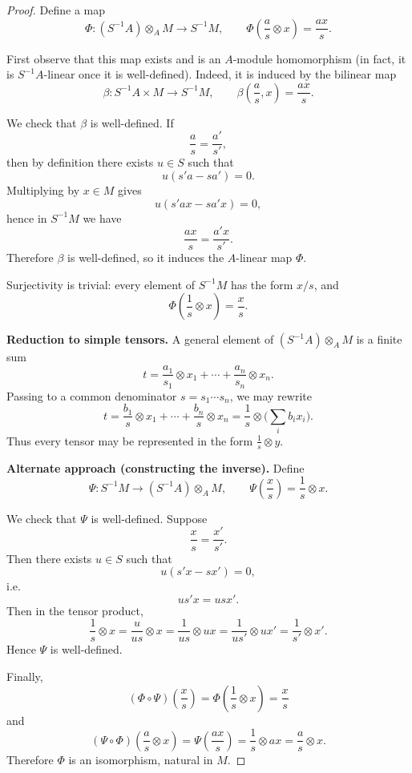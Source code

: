 \documentclass[11pt,a4paper]{article}
\theoremstyle{definition}
\theoremstyle{plain}
\theoremstyle{remark}
\begin{document}
\begin{proof}
    Define a map
    \[
    \Phi:(S^{-1}A)\otimes_A M \longrightarrow S^{-1}M,
    \qquad 
    \Phi\!\left(\frac{a}{s}\otimes x\right)=\frac{ax}{s}.
    \]

    First observe that this map exists and is an $A$-module homomorphism (in fact, it is $S^{-1}A$-linear once it is well-defined).
    Indeed, it is induced by the bilinear map
    \[
    \beta:S^{-1}A\times M\to S^{-1}M,
    \qquad 
    \beta\!\left(\frac{a}{s},x\right)=\frac{ax}{s}.
    \]

    We check that $\beta$ is well-defined. If
    \[
    \frac{a}{s}=\frac{a'}{s'},
    \]
    then by definition there exists $u\in S$ such that
    \[
    u(s'a-sa')=0.
    \]
    Multiplying by $x\in M$ gives
    \[
    u(s'ax-sa'x)=0,
    \]
    hence in $S^{-1}M$ we have
    \[
    \frac{ax}{s}=\frac{a'x}{s'}.
    \]
    Therefore $\beta$ is well-defined, so it induces the $A$-linear map $\Phi$.

    Surjectivity is trivial: every element of $S^{-1}M$ has the form $x/s$, and
    \[
    \Phi\!\left(\frac{1}{s}\otimes x\right)=\frac{x}{s}.
    \]

    \medskip

    \textbf{Reduction to simple tensors.}
    A general element of $(S^{-1}A)\otimes_A M$ is a finite sum
    \[
    t=\frac{a_1}{s_1}\otimes x_1+\cdots+\frac{a_n}{s_n}\otimes x_n.
    \]
    Passing to a common denominator $s=s_1\cdots s_n$, we may rewrite
    \[
    t=\frac{b_1}{s}\otimes x_1+\cdots+\frac{b_n}{s}\otimes x_n
    =\frac{1}{s}\otimes\Big(\sum_i b_i x_i\Big).
    \]
    Thus every tensor may be represented in the form $\frac{1}{s}\otimes y$.

    \medskip

    \textbf{Alternate approach (constructing the inverse).}
    Define
    \[
    \Psi:S^{-1}M\to (S^{-1}A)\otimes_A M,
    \qquad 
    \Psi\!\left(\frac{x}{s}\right)=\frac{1}{s}\otimes x.
    \]

    We check that $\Psi$ is well-defined. Suppose
    \[
    \frac{x}{s}=\frac{x'}{s'}.
    \]
    Then there exists $u\in S$ such that
    \[
    u(s'x-sx')=0,
    \]
    i.e.
    \[
    us'x=usx'.
    \]
    Then in the tensor product,
    \[
    \frac{1}{s}\otimes x
    =\frac{u}{us}\otimes x
    =\frac{1}{us}\otimes ux
    =\frac{1}{us'}\otimes ux'
    =\frac{1}{s'}\otimes x'.
    \]
    Hence $\Psi$ is well-defined.

    Finally,
    \[
        (\Phi\circ\Psi)\!\left(\frac{x}{s}\right)
        =\Phi\!\left(\frac{1}{s}\otimes x\right)
        =\frac{x}{s}
    \]
    and
    \[
    (\Psi\circ\Phi)\!\left(\frac{a}{s}\otimes x\right)
    =\Psi\!\left(\frac{ax}{s}\right)
    =\frac{1}{s}\otimes ax
    =\frac{a}{s}\otimes x.
    \]
    Therefore $\Phi$ is an isomorphism, natural in $M$.
\end{proof}
\end{document}
